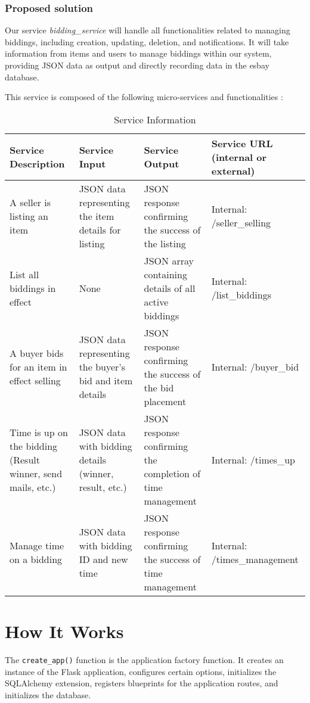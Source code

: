 \documentclass[12pt]{article}
\begin{document}
\subsubsection{Proposed solution} 
Our service \textit{bidding\_service} will handle all functionalities related to managing biddings, including creation, updating, deletion, and notifications. It will take information from items and users to manage biddings within our system, providing JSON data as output and directly recording data in the esbay database.

This service is composed of the following micro-services and functionalities : 
\begin{table}[h]
    \centering
    \begin{tabular}{|p{3cm}|p{5cm}|p{5cm}|p{4cm}|}
    \hline
    \textbf{Service Description} & \textbf{Service Input} & \textbf{Service Output} & \textbf{Service URL (internal or external)} \\ \hline
    A seller is listing an item & JSON data representing the item details for listing & JSON response confirming the success of the listing & Internal: /seller\_selling \\ \hline
    List all biddings in effect & None & JSON array containing details of all active biddings & Internal: /list\_biddings \\ \hline
    A buyer bids for an item in effect selling & JSON data representing the buyer's bid and item details & JSON response confirming the success of the bid placement & Internal: /buyer\_bid \\ \hline
    Time is up on the bidding (Result winner, send mails, etc.) & JSON data with bidding details (winner, result, etc.) & JSON response confirming the completion of time management & Internal: /times\_up \\ \hline
    Manage time on a bidding & JSON data with bidding ID and new time & JSON response confirming the success of time management & Internal: /times\_management \\ \hline
    \end{tabular}
    \caption{Service Information}
    \label{tab:service-info}
\end{table}

\section{How It Works}
The \verb|create_app()| function is the application factory function. It creates an instance of the Flask application, configures certain options, initializes the SQLAlchemy extension, registers blueprints for the application routes, and initializes the database.
\end{document}
